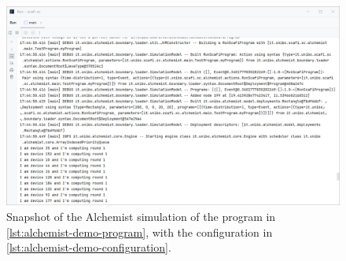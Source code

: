 \begin{figure}
    \centering
    \caption{Snapshot of the Alchemist simulation of the program in \cref{lst:alchemist-demo-program}, with the configuration in \cref{lst:alchemist-demo-configuration}.}
    \label{fig:alchemist-simulation}
    \bigskip
    \includegraphics[width=\linewidth]{figures/alchemist-demo.png}
\end{figure}
